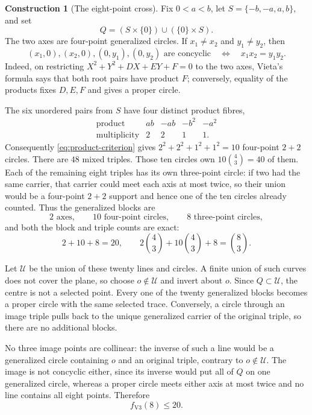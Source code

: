 \documentclass[11pt]{article}
\theoremstyle{definition}
\newtheorem{construction}[theorem]{Construction}
\theoremstyle{remark}
\begin{document}
\begin{construction}[The eight-point cross]\label{con:cross}
Fix \(0<a<b\), let \(S=\{-b,-a,a,b\}\), and set
\[
 Q=(S\times\{0\})\cup(\{0\}\times S).
\]
The two axes are four-point generalized circles.  If \(x_1\neq x_2\) and
\(y_1\neq y_2\), then
\begin{equation}\label{eq:product-criterion}
 (x_1,0),(x_2,0),(0,y_1),(0,y_2)
 \text{ are concyclic}
 \quad\Longleftrightarrow\quad x_1x_2=y_1y_2.
\end{equation}
Indeed, on restricting
\(X^2+Y^2+DX+EY+F=0\) to the two axes, Vieta's formula says that both
root pairs have product \(F\); conversely, equality of the products fixes
\(D,E,F\) and gives a proper circle.

The six unordered pairs from \(S\) have four distinct product fibres,
\[
 \begin{array}{c|cccc}
 \text{product}&ab&-ab&-b^2&-a^2\\ \hline
 \text{multiplicity}&2&2&1&1.
 \end{array}
\]
Consequently \eqref{eq:product-criterion} gives
\(2^2+2^2+1^2+1^2=10\) four-point \(2+2\) circles.  There are \(48\) mixed
triples.  Those ten circles own \(10\binom43=40\) of them.  Each of the
remaining eight triples has its own three-point circle: if two had the same
carrier, that carrier could meet each axis at most twice, so their union
would be a four-point \(2+2\) support and hence one of the ten circles
already counted.  Thus the generalized blocks are
\[
 2\text{ axes},\qquad10\text{ four-point circles},\qquad
 8\text{ three-point circles},
\]
and both the block and triple counts are exact:
\begin{equation}\label{eq:cross-count}
 2+10+8=20,
 \qquad
 2\binom43+10\binom43+8=\binom83.
\end{equation}

Let \(\mathcal U\) be the union of these twenty lines and circles.  A finite
union of such curves does not cover the plane, so choose \(o\notin\mathcal U\)
and invert about \(o\).  Since \(Q\subset\mathcal U\), the centre is not a
selected point.  Every one of the twenty generalized blocks becomes a
proper circle with the same selected trace.  Conversely, a circle through
an image triple pulls back to the unique generalized carrier of the
original triple, so there are no additional blocks.

No three image points are collinear: the inverse of such a line would be a
generalized circle containing \(o\) and an original triple, contrary to
\(o\notin\mathcal U\).  The image is not concyclic either, since its inverse
would put all of \(Q\) on one generalized circle, whereas a proper circle
meets either axis at most twice and no line contains all eight points.
Therefore
\begin{equation}\label{eq:upper-eight}
 f_{\mathrm{V3}}(8)\leq20.
\end{equation}
\end{construction}
\end{document}
